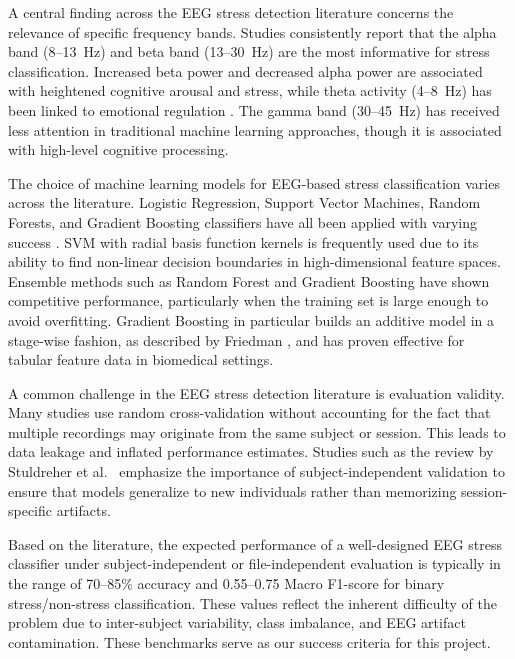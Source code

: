 \documentclass[12pt,a4paper]{article}
\begin{document}
	A central finding across the EEG stress detection literature concerns the relevance of specific frequency bands. Studies consistently report that the alpha band (8--13~Hz) and beta band (13--30~Hz) are the most informative for stress classification. Increased beta power and decreased alpha power are associated with heightened cognitive arousal and stress, while theta activity (4--8~Hz) has been linked to emotional regulation \cite{bandratios2021}. The gamma band (30--45~Hz) has received less attention in traditional machine learning approaches, though it is associated with high-level cognitive processing.

	The choice of machine learning models for EEG-based stress classification varies across the literature. Logistic Regression, Support Vector Machines, Random Forests, and Gradient Boosting classifiers have all been applied with varying success \cite{stressreview2022}. SVM with radial basis function kernels is frequently used due to its ability to find non-linear decision boundaries in high-dimensional feature spaces. Ensemble methods such as Random Forest and Gradient Boosting have shown competitive performance, particularly when the training set is large enough to avoid overfitting. Gradient Boosting in particular builds an additive model in a stage-wise fashion, as described by Friedman \cite{friedman2001}, and has proven effective for tabular feature data in biomedical settings.

	A common challenge in the EEG stress detection literature is evaluation validity. Many studies use random cross-validation without accounting for the fact that multiple recordings may originate from the same subject or session. This leads to data leakage and inflated performance estimates. Studies such as the review by Stuldreher et al.~\cite{stuldreher2021} emphasize the importance of subject-independent validation to ensure that models generalize to new individuals rather than memorizing session-specific artifacts.

	Based on the literature, the expected performance of a well-designed EEG stress classifier under subject-independent or file-independent evaluation is typically in the range of 70--85\% accuracy and 0.55--0.75 Macro F1-score for binary stress/non-stress classification. These values reflect the inherent difficulty of the problem due to inter-subject variability, class imbalance, and EEG artifact contamination. These benchmarks serve as our success criteria for this project.
	
\end{document}
